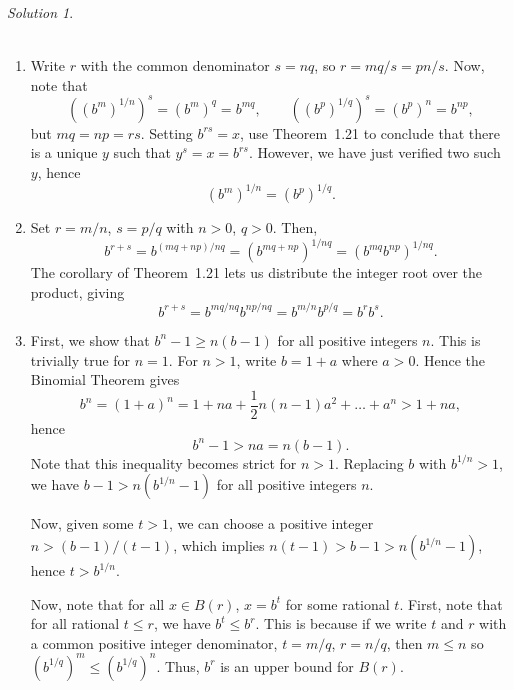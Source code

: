\documentclass[11pt]{report}
\theoremstyle{remark}
\newtheorem*{solution}{Solution}
\begin{document}
    \begin{solution} \\~\\
        \begin{enumerate}
            \item Write $r$ with the common denominator $s = nq$, so $r = mq / s =
            pn / s$. Now, note that \[
                \left((b^m)^{1 / n}\right)^s = (b^m)^{q} = b^{mq}, \qquad
                \left((b^p)^{1 / q}\right)^s = (b^p)^{n} = b^{np},
            \] but $mq = np = rs$. Setting $b^{rs} = x$, use Theorem~1.21 to conclude
            that there is a unique $y$ such that $y^s = x = b^{rs}$. However, we
            have just verified two such $y$, hence \[
                (b^m)^{1 / n} = (b^p)^{1 / q}.
            \]
            \item Set $r = m / n$, $s = p / q$ with $n > 0$, $q > 0$. Then, \[
                b^{r + s} = b^{(mq + np) / nq} = (b^{mq + np})^{1 / nq} =
                (b^{mq}b^{np})^{1 / nq}.
            \] The corollary of Theorem~1.21 lets us distribute the integer root
            over the product, giving \[
                b^{r + s} = b^{mq / nq} b^{np / nq} = b^{m / n}b^{p / q} = b^rb^s.
            \] 
            \item First, we show that $b^n - 1 \geq n(b - 1)$ for all positive integers
            $n$. This is trivially true for $n = 1$. For $n > 1$, write $b = 1 + a$
            where $a > 0$. Hence the Binomial Theorem gives \[
                b^n = (1 + a)^n = 1 + na + \frac{1}{2}n(n - 1)a^2 + \dots + a^n > 1
                + na,
            \] hence \[
                b^n - 1 > na = n(b - 1).
            \] Note that this inequality becomes strict for $n > 1$.
            Replacing $b$ with $b^{1 / n} > 1$, we have $b - 1 > n(b^{1 / n} - 1)$ 
            for all positive integers $n$.

            Now, given some $t > 1$, we can choose a positive integer 
            $n > (b - 1) / (t - 1)$, which implies $n(t - 1) > b - 1 > n(b^{1 / n} -
            1)$, hence $t > b^{1 / n}$.

            Now, note that for all $x \in B(r)$, $x = b^t$ for some rational $t$.
            First, note that for all rational $t \leq r$, we have $b^t \leq b^r$.
            This is because if we write $t$ and $r$ with a common positive integer 
            denominator, $t = m / q$, $r = n / q$, then $m \leq n$ so $(b^{1 / q})^m
            \leq (b^{1 / q})^n$. Thus, $b^r$ is an upper bound for $B(r)$.


\end{enumerate}
\end{solution}
\end{document}
